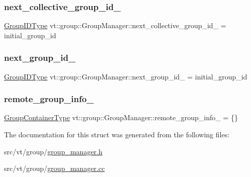 \subsubsection{\texorpdfstring{next\+\_\+collective\+\_\+group\+\_\+id\+\_\+}{next\_collective\_group\_id\_}}
{\footnotesize\ttfamily \hyperlink{namespacevt_1_1group_a805a6643787ae841525c371fd0cefeb3}{Group\+I\+D\+Type} vt\+::group\+::\+Group\+Manager\+::next\+\_\+collective\+\_\+group\+\_\+id\+\_\+ = initial\+\_\+group\+\_\+id\hspace{0.3cm}{\ttfamily [private]}}

\mbox{\label{structvt_1_1group_1_1_group_manager_ad14079e35fc22c1ddc8627f4f8bd2ffe}} 
\subsubsection{\texorpdfstring{next\+\_\+group\+\_\+id\+\_\+}{next\_group\_id\_}}
{\footnotesize\ttfamily \hyperlink{namespacevt_1_1group_a805a6643787ae841525c371fd0cefeb3}{Group\+I\+D\+Type} vt\+::group\+::\+Group\+Manager\+::next\+\_\+group\+\_\+id\+\_\+ = initial\+\_\+group\+\_\+id\hspace{0.3cm}{\ttfamily [private]}}

\mbox{\label{structvt_1_1group_1_1_group_manager_a970a1f928ab59533e256a30f1426ccee}} 
\subsubsection{\texorpdfstring{remote\+\_\+group\+\_\+info\+\_\+}{remote\_group\_info\_}}
{\footnotesize\ttfamily \hyperlink{structvt_1_1group_1_1_group_manager_a9e2a0989865f4097bb5edd390865555e}{Group\+Container\+Type} vt\+::group\+::\+Group\+Manager\+::remote\+\_\+group\+\_\+info\+\_\+ = \{\}\hspace{0.3cm}{\ttfamily [private]}}



The documentation for this struct was generated from the following files\+:\begin{DoxyCompactItemize}
\item 
src/vt/group/\hyperlink{group__manager_8h}{group\+\_\+manager.\+h}\item 
src/vt/group/\hyperlink{group__manager_8cc}{group\+\_\+manager.\+cc}\end{DoxyCompactItemize}
